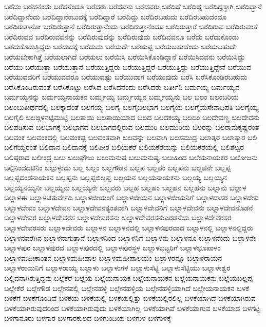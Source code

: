 {ಬರೆದಂ
ಬರೆದನೆಂದು
ಬರೆದನೆಂದೂ
ಬರೆದರು
ಬರೆದವನು
ಬರೆದವರು
ಬರೆದಿದೆ
ಬರೆದಿದ್ದ
ಬರೆದಿದ್ದಕ್ಕಾಗಿ
ಬರೆದಿದ್ದಾನೆ
ಬರೆದಿದ್ದಾನೆಂದು
ಬರೆದಿದ್ದಾನೆಂಬುದಕ್ಕೆ
ಬರೆದಿದ್ದಾರೆ
ಬರೆದಿದ್ದು
ಬರೆದಿರಬಹುದು
ಬರೆದಿರಬಹುದೆಂದೂ
ಬರೆದಿರುತಾನೋ
ಬರೆದಿರುತ್ತಾನೆ
ಬರೆದಿರುತ್ತಾನೆಂದು
ಬರೆದಿರುತ್ತಾನೆಂದೂ
ಬರೆದಿರುತ್ತಾರೆ
ಬರೆದಿರುವ
ಬರೆದಿರುವಂತೆ
ಬರೆದಿರುವವ
ಬರೆದಿರುವವನನ್ನು
ಬರೆದಿರುವುದನ್ನು
ಬರೆದಿರುವುದು
ಬರೆದಿವವನೂ
ಬರೆದು
ಬರೆದುಕೊಂಡು
ಬರೆದುಕೊಡುತ್ತಿದ್ದರು
ಬರೆದುದಕ್ಕೆ
ಬರೆದುದು
ಬರೆಯದೇ
ಬರೆಯಪ್ಪ
ಬರೆಯಬಹುದೆಂದು
ಬರೆಯಬಹುದೇ
ಬರೆಯಬೇಕಾಗಿತ್ತೆ
ಬರೆಯಲಾಗಿದೆ
ಬರೆಯಲು
ಬರೆಯಿಸಿ
ಬರೆಯಿಸಿಕೊಂಡಿದ್ದಾನೆ
ಬರೆಯಿಸಿದವನು
ಬರೆಯಿಸಿದ್ದು
ಬರೆಯು
ಬರೆಯುತ್ತಾ
ಬರೆಯುತ್ತಾನೆ
ಬರೆಯುತ್ತಿದ್ದರು
ಬರೆಯುತ್ತಿದ್ದರೆ
ಬರೆಯುತ್ತಿದ್ದು
ಬರೆಯುತ್ತಿದ್ದೇನೆ
ಬರೆಯುವ
ಬರೆಯುವವರಿಗೆ
ಬರೆಯುವವರೂ
ಬರೆಯುವಷ್ಟು
ಬರೆಯುವಾಗ
ಬರೆಯುವುದು
ಬರೆಸಿ
ಬರೆಸಿಕೊಂಡಿರಬಹುದು
ಬರೆಸಿಕೊಂಡಿರುವಂತೆ
ಬರೆಸಿಕೊಟ್ಟು
ಬರೆಸಿದ
ಬರೆಸಿದನೆಂದು
ಬರೆಸಿದರು
ಬರ್ತೀನಿ
ಬರ್ಮಯ್ಯ
ಬರ್ಮಯ್ಯನ
ಬರ್ಮಯ್ಯನನ್ನು
ಬರ್ಮಯ್ಯನಾಯಕನ
ಬರ್ಮ್ಮಯ್ಯ
ಬರ್ಮ್ಮಯ್ಯನ
ಬರ್ಮ್ಮಯ್ಯನು
ಬಲ
ಬಲಂ
ಬಲಂಬರಿಯ
ಬಲಂಬುತೀರ್ಥದಲ್ಲಿ
ಬಲಕ್ಕಾದಂತೆ
ಬಲಗಯ್ಯ
ಬಲಗೈ
ಬಲಗೈಬಲಭಾಗ
ಬಲಗೈಯ
ಬಲಗೈಯಸೇನಾಧಿಪತಿ
ಬಲಗೈಯ್ಯ
ಬಲಗೈಲಿ
ಬಲಙ್ಗಳನಟ್ಟಿಮುಟ್ಟಿ
ಬಲತಾಯಿ
ಬಲತಾಯಿಯಾದ
ಬಲದ
ಬಲದಕಯ್ಯ
ಬಲದಿಂ
ಬಲದೇವಣ್ಣ
ಬಲದೇವನು
ಬಲಪಡಿಸುವ
ಬಲಭಾಗಕ್ಕೆ
ಬಲಭಾಗದ
ಬಲಭಾಗದಲ್ಲಿರುವ
ಬಲಮುರಿ
ಬಲಮುರಿಯ
ಬಲರನ್ನು
ಬಲರಾಮಕೃಷ್ಣರಂತೆ
ಬಲವಂಕ
ಬಲವಂಕದಲ್ಲಿ
ಬಲವಂಕಪ್ಪ
ಬಲವಂತವಾಗಿ
ಬಲವನ್ನು
ಬಲವಾಗಿ
ಬಲಸಮುದ್ರ
ಬಲಾತ್ಕರ
ಬಲಾತ್ಕಾರ
ಬಲಿ
ಬಲಿಗೆಯ್ದರಂತೆ
ಬಲಿದಾನ
ಬಲಿದಾನಕ್ಕೆ
ಬಲಿಪೀಠ
ಬಲಿಯಕೆರೆ
ಬಲಿಯಕೆರೆಯನ್ನು
ಬಲಿಯಕೆರೆಯಲ್ಲಿ
ಬಲಿಶೆಲ್ವರ
ಬಲಿಷ್ಠರಾದ
ಬಲೀಂದ್ರ
ಬಲು
ಬಲುಫೌಜು
ಬಲುಮನುಷ
ಬಲುಮನುಷ್ಯ
ಬಲುಹಿಂದ
ಬಲೆಯನಾಯಕರ
ಬಲೋಜನು
ಬಲ್ಪಿನಿಂದದಟಿನಿಂ
ಬಲ್ಪುಳ್ಳುದು
ಬಲ್ಲ
ಬಲ್ಲಂ
ಬಲ್ಲಗೌಡನ
ಬಲ್ಲಪ
ಬಲ್ಲಪಂ
ಬಲ್ಲಪನು
ಬಲ್ಲಪನೇ
ಬಲ್ಲಪ್ಪ
ಬಲ್ಲಪ್ಪದಂಡನಾಯಕನ
ಬಲ್ಲಪ್ಪನು
ಬಲ್ಲಪ್ಪಬಿಲ್ಲಪ್ಪ
ಬಲ್ಲಯನ
ಬಲ್ಲಯನಾಯಕನು
ಬಲ್ಲಯ್ಯ
ಬಲ್ಲಯ್ಯನ
ಬಲ್ಲಯ್ಯನಯ್ಯನೀ
ಬಲ್ಲಯ್ಯನು
ಬಲ್ಲಯ್ಯನೇ
ಬಲ್ಲವರು
ಬಲ್ಲಹ
ಬಲ್ಲಹಂ
ಬಲ್ಲಹನ
ಬಲ್ಲಹನು
ಬಲ್ಲಾನು
ಬಲ್ಲಾಳ
ಬಲ್ಲಾಳಈ
ಬಲ್ಲಾಳಚತುರ್ವೇದಿ
ಬಲ್ಲಾಳಜೀಯಂಗೆ
ಬಲ್ಲಾಳಜೀಯನ
ಬಲ್ಲಾಳಜೀಯನಿಗೆ
ಬಲ್ಲಾಳದಾಸರ
ಬಲ್ಲಾಳದೇವ
ಬಲ್ಲಾಳದೇವಂ
ಬಲ್ಲಾಳದೇವನ
ಬಲ್ಲಾಳದೇವನತ್ಯಂತವಾಗಿ
ಬಲ್ಲಾಳದೇವನಿಗೆ
ಬಲ್ಲಾಳದೇವನು
ಬಲ್ಲಾಳದೇವನೊಡನೆ
ಬಲ್ಲಾಳದೇವರ
ಬಲ್ಲಾಳದೇವರಸ
ಬಲ್ಲಾಳದೇವರಸನು
ಬಲ್ಲಾಳದೇವರಸನುಎರಡನೆಯ
ಬಲ್ಲಾಳದೇವರಸರ
ಬಲ್ಲಾಳದೇವರಸರು
ಬಲ್ಲಾಳದೇವರು
ಬಲ್ಲಾಳನ
ಬಲ್ಲಾಳನದಲ್ಲಿ
ಬಲ್ಲಾಳನಪುರವಾದ
ಬಲ್ಲಾಳನಲ್ಲಿ
ಬಲ್ಲಾಳನಲ್ಲಿದ್ದರು
ಬಲ್ಲಾಳನವರೆಗಿನ
ಬಲ್ಲಾಳನಾಗುತ್ತಾನೆ
ಬಲ್ಲಾಳನಿಂದ
ಬಲ್ಲಾಳನಿಗೆ
ಬಲ್ಲಾಳನು
ಬಲ್ಲಾಳನೂ
ಬಲ್ಲಾಳನೆಂದು
ಬಲ್ಲಾಳನೇ
ಬಲ್ಲಾಳಪುರ
ಬಲ್ಲಾಳಪುರದ
ಬಲ್ಲಾಳಪುರದಲ್ಲಿ
ಬಲ್ಲಾಳಪುರಸ್ಥಳ
ಬಲ್ಲಾಳಭಟ್ಟರಿಗೆ
ಬಲ್ಲಾಳಭೂಪಾಳಂ
ಬಲ್ಲಾಳಮಹೀಕಾಂತನ
ಬಲ್ಲಾಳಮಹೀಪಾಲ
ಬಲ್ಲಾಳಮಹೀಪಾಲಯಂ
ಬಲ್ಲಾಳರನ್ನೂ
ಬಲ್ಲಾಳರಾಯನ
ಬಲ್ಲಾಳರಾಯನಿಗೆ
ಬಲ್ಲಾಳರಾಯ್ಯ
ಬಲ್ಲಾಳು
ಬಲ್ಲಾಳುಗಳ
ಬಲ್ಲಾಳುಸೆಟ್ಟಿ
ಬಲ್ಲಾಳುಸೆಟ್ಟಿಯು
ಬಲ್ಲಾಳೇಶ್ವರ
ಬಲ್ಲಿದನಾಗಿರುತ್ತಿದ್ದನು
ಬಲ್ಲೆಕೆರೆ
ಬಲ್ಲೆಯ
ಬಲ್ಲೆಯನಾಯಕ
ಬಲ್ಲೆಯನಾಯಕನ
ಬಲ್ಲೆಯನಾಯಕನು
ಬಲ್ಲೆಯಬಲ್ಲಪ್ಪ
ಬಲ್ಲೇಕೆರೆ
ಬಲ್ಲೇಗೌಡ
ಬಲ್ಲೇನಪಲ್ಲಿ
ಬಲ್ಲೇನಹಳ್ಳಿ
ಬಲ್ಲೇನಹಳ್ಳಿಯ
ಬಲ್ಲೇನಹಳ್ಳಿಯಾಗಿದೆ
ಬಲ್ಲೇಯನಾಯಕನ
ಬಳಕೆ
ಬಳಕೆಗೆ
ಬಳಕೆಗೊಂಡಿವೆ
ಬಳಕೆಯ
ಬಳಕೆಯಲ್ಲಿ
ಬಳಕೆಯಲ್ಲಿತ್ತು
ಬಳಕೆಯಲ್ಲಿರಲಿಲ್ಲ
ಬಳಕೆಯಾಗಿದೆ
ಬಳಕೆಯಾಗಿರುವ
ಬಳಕೆಯಾಗಿರುವುದರಿಂದ
ಬಳಕೆಯಾಗಿರುವುದು
ಬಳಕೆಯಾಗಿಲ್ಲ
ಬಳಕೆಯಾಗಿವೆ
ಬಳಕೆಯಾಗುವ
ಬಳಕೆಯಾದ
ಬಳಗಟ್ಟ
ಬಳಗಾನೂರು
ಬಳಗಾರ
ಬಳಗಾರಕುಲದ
ಬಳಗುಂದಿಯ
ಬಳಗುಳ
ಬಳಗುಳಕ್ಕೆ
}
